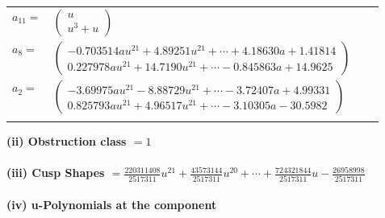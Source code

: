\documentclass[1p]{elsarticle_modified}
\theoremstyle{definition}
\begin{document}
\begin{tabular}{m{7pt} m{180pt} m{7pt} m{180pt} }
\flushright $a_{11}=$&$\begin{pmatrix}u\\u^3+u\end{pmatrix}$ \\
\flushright $a_{8}=$&$\begin{pmatrix}-0.703514 a u^{21}+4.89251 u^{21}+\cdots+4.18630 a+1.41814\\0.227978 a u^{21}+14.7190 u^{21}+\cdots-0.845863 a+14.9625\end{pmatrix}$ \\
\flushright $a_{2}=$&$\begin{pmatrix}-3.69975 a u^{21}-8.88729 u^{21}+\cdots-3.72407 a+4.99331\\0.825793 a u^{21}+4.96517 u^{21}+\cdots-3.10305 a-30.5982\end{pmatrix}$\\&\end{tabular}
\flushleft \textbf{(ii) Obstruction class $= 1$}\\~\\
\flushleft \textbf{(iii) Cusp Shapes $= \frac{220311408}{2517311} u^{21}+\frac{43573144}{2517311} u^{20}+\cdots+\frac{724321844}{2517311} u-\frac{26958998}{2517311}$}\\~\\
\newpage\renewcommand{\arraystretch}{1}
\flushleft \textbf{(iv) u-Polynomials at the component}\newline \\
\end{document}
